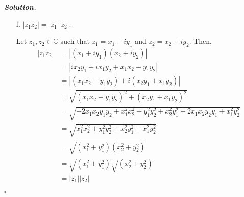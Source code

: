 \documentclass[12pt]{report}
\newenvironment{solution}[1][\it{Solution}]{\textbf{#1. } }{$\square$}
\def\C{{\mathbb C}}
\begin{document}
\begin{solution}
\begin{enumerate}
        \item [f.] $|z_1z_2| = |z_1||z_2|$.
        
        Let $z_1,z_2 \in \C$ such that $z_1 = x_1 + iy_1$ and $z_2 = x_2 + i y_2$. Then,
        \begin{align*}
            |z_1z_2| &= |(x_1 + iy_1)(x_2 + iy_2)|\\
                    &= |i x_2 y_1 + i x_1 y_2 + x_1 x_2 - y_1 y_2|\\
                    &= |(x_1 x_2 - y_1 y_2) + i(x_2 y_1 + x_1 y_2)|\\
                    &= \sqrt{(x_1 x_2 - y_1 y_2)^2 + (x_2 y_1 + x_1 y_2)^2}\\
                    &= \sqrt{-2 x_1 x_2 y_1 y_2 + x_1^2 x_2^2 + y_1^2 y_2^2 + x_2^2 y_1^2 + 2 x_1 x_2 y_2 y_1 + x_1^2 y_2^2}\\
                    &= \sqrt{x_1^2 x_2^2 + y_1^2 y_2^2 + x_2^2 y_1^2 + x_1^2 y_2^2}\\
                    &= \sqrt{(x_1^2 + y_1^2)(x_2^2 + y_2^2)}\\
                    &=\sqrt{(x_1^2 + y_1^2)}\sqrt{(x_2^2 + y_2^2)}\\
                    &=|z_1||z_2|
        \end{align*}
    \end{enumerate}
\end{solution}

\end{document}
